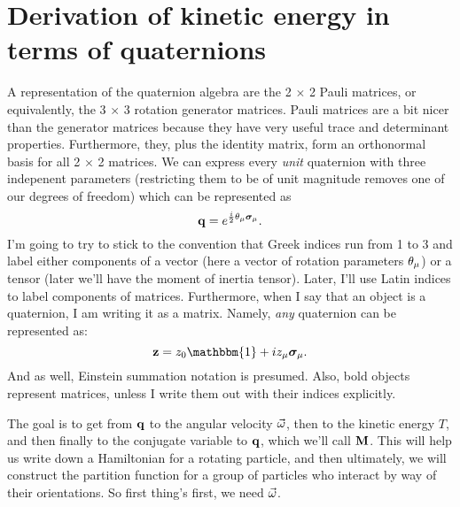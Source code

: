 \documentclass[12pt]{article}
\begin{document}
\section{Derivation of kinetic energy in terms of quaternions}
A representation of the quaternion algebra are the 2 $\times$ 2 Pauli matrices, 
or equivalently, the 3 $\times$ 3 rotation generator matrices. Pauli matrices 
are a bit nicer than the generator matrices because they have very useful trace 
and determinant properties. Furthermore, they, plus the identity matrix, form 
an orthonormal basis for all 2 $\times$ 2 matrices. We can express every 
\emph{unit} quaternion with three indepenent parameters (restricting them to be 
of unit magnitude removes one of our degrees of freedom) which can be 
represented as
\[ \mathbf{q} = e^{\frac{i}{2}\theta_\mu \bm{\sigma}_\mu}.\]
I'm going to try to stick to the convention that Greek indices run from 1 to 3 
and label either components of a vector (here a vector of rotation parameters 
$\theta_\mu$) or a tensor (later we'll have the moment of inertia tensor). Later, 
I'll use Latin indices to label components of matrices. Furthermore, when I say 
that an object is a quaternion, I am writing it as a matrix. Namely, \emph{any} 
quaternion can be represented as:
\[ \bv{z} = z_0 \mathbbm{1} + iz_\mu \Sig_\mu.\]
And as well, Einstein summation notation is presumed. Also, bold objects 
represent matrices, unless I write them out with their indices explicitly.

The goal is to get from $\mathbf{q}$ to the angular velocity $\vec{\omega}$, then to the 
kinetic energy $T$, and then finally to the conjugate variable to $\mathbf{q}$, 
which we'll call $\mathbf{M}$. This will help us write down a Hamiltonian for a 
rotating particle, and then ultimately, we will construct the partition 
function for a group of particles who interact by way of their orientations. So 
first thing's first, we need $\vec{\omega}$.
\end{document}
